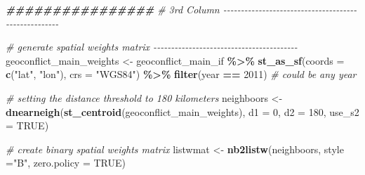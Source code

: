 \documentclass[
  a4paper,
]{article}
\newenvironment{Shaded}{\begin{snugshade}}{\end{snugshade}}
\newcommand{\AttributeTok}[1]{\textcolor[rgb]{0.13,0.29,0.53}{#1}}
\newcommand{\CommentTok}[1]{\textcolor[rgb]{0.56,0.35,0.01}{\textit{#1}}}
\newcommand{\ConstantTok}[1]{\textcolor[rgb]{0.56,0.35,0.01}{#1}}
\newcommand{\DecValTok}[1]{\textcolor[rgb]{0.00,0.00,0.81}{#1}}
\newcommand{\DocumentationTok}[1]{\textcolor[rgb]{0.56,0.35,0.01}{\textbf{\textit{#1}}}}
\newcommand{\FunctionTok}[1]{\textcolor[rgb]{0.13,0.29,0.53}{\textbf{#1}}}
\newcommand{\NormalTok}[1]{#1}
\newcommand{\OtherTok}[1]{\textcolor[rgb]{0.56,0.35,0.01}{#1}}
\newcommand{\SpecialCharTok}[1]{\textcolor[rgb]{0.81,0.36,0.00}{\textbf{#1}}}
\newcommand{\StringTok}[1]{\textcolor[rgb]{0.31,0.60,0.02}{#1}}
\begin{document}
\begin{Shaded}
\begin{Highlighting}[]
\DocumentationTok{\#\#\#\#\#\#\#\#\#\#\#\#\#\#\#\#}
\CommentTok{\# 3rd Column  {-}{-}{-}{-}{-}{-}{-}{-}{-}{-}{-}{-}{-}{-}{-}{-}{-}{-}{-}{-}{-}{-}{-}{-}{-}{-}{-}{-}{-}{-}{-}{-}{-}{-}{-}{-}{-}{-}{-}{-}{-}{-}{-}{-}{-}{-}{-}{-}{-}{-}{-}{-}{-}}

\CommentTok{\# generate spatial weights matrix {-}{-}{-}{-}{-}{-}{-}{-}{-}{-}{-}{-}{-}{-}{-}{-}{-}{-}{-}{-}{-}{-}{-}{-}{-}{-}{-}{-}{-}{-}{-}{-}{-}{-}{-}{-}{-}{-}{-}{-}{-}}
\NormalTok{geoconflict\_main\_weights }\OtherTok{\textless{}{-}}\NormalTok{ geoconflict\_main\_if }\SpecialCharTok{\%\textgreater{}\%}
  \FunctionTok{st\_as\_sf}\NormalTok{(}\AttributeTok{coords =} \FunctionTok{c}\NormalTok{(}\StringTok{"lat"}\NormalTok{, }\StringTok{"lon"}\NormalTok{), }\AttributeTok{crs =} \StringTok{"WGS84"}\NormalTok{) }\SpecialCharTok{\%\textgreater{}\%}
  \FunctionTok{filter}\NormalTok{(year }\SpecialCharTok{==} \DecValTok{2011}\NormalTok{) }\CommentTok{\# could be any year}

\CommentTok{\# setting the distance threshold to 180 kilometers}
\NormalTok{neighboors }\OtherTok{\textless{}{-}} \FunctionTok{dnearneigh}\NormalTok{(}\FunctionTok{st\_centroid}\NormalTok{(geoconflict\_main\_weights), }\AttributeTok{d1 =} \DecValTok{0}\NormalTok{, }\AttributeTok{d2 =} \DecValTok{180}\NormalTok{, }\AttributeTok{use\_s2 =} \ConstantTok{TRUE}\NormalTok{)}

\CommentTok{\# create binary spatial weights matrix}
\NormalTok{listwmat }\OtherTok{\textless{}{-}} \FunctionTok{nb2listw}\NormalTok{(neighboors, }\AttributeTok{style =}\StringTok{"B"}\NormalTok{, }\AttributeTok{zero.policy =} \ConstantTok{TRUE}\NormalTok{)}


\end{Highlighting}
\end{Shaded}
\end{document}
